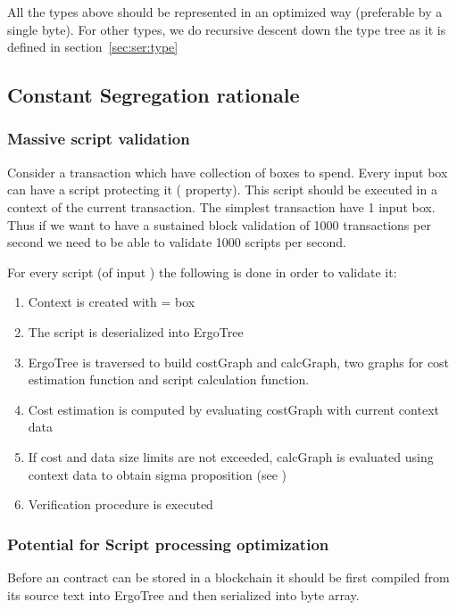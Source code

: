 All the types above should be represented in an optimized way (preferable by a single byte).
For other types, we do recursive descent down the type tree as it is defined in section~\ref{sec:ser:type}

\subsection{Constant Segregation rationale}

\subsubsection{Massive script validation}

Consider a transaction  which have  collection of boxes to
spend. Every input box can have a script protecting it (
property). This script should be executed in a context of the current
transaction. The simplest transaction have 1 input box. Thus if we want to
have a sustained block validation of 1000 transactions per second we need to
be able to validate 1000 scripts per second.

For every script (of input ) the following is done in order to
validate it:
\begin{enumerate}
    \item Context is created with  = box
    \item The script is deserialized into ErgoTree 
    \item ErgoTree is traversed to build costGraph and calcGraph, two graphs for
    cost estimation function and script calculation function.
    \item Cost estimation is computed by evaluating costGraph with current context data
    \item If cost and data size limits are not exceeded, calcGraph is
    evaluated using context data to obtain sigma proposition (see
    \hyperref[sec:type:SigmaProp]{})
    \item Verification procedure is executed
\end{enumerate}

\subsubsection{Potential for Script processing optimization}

Before an \langname contract can be stored in a blockchain it should be first
compiled from its source text into ErgoTree and then serialized into byte
array.

